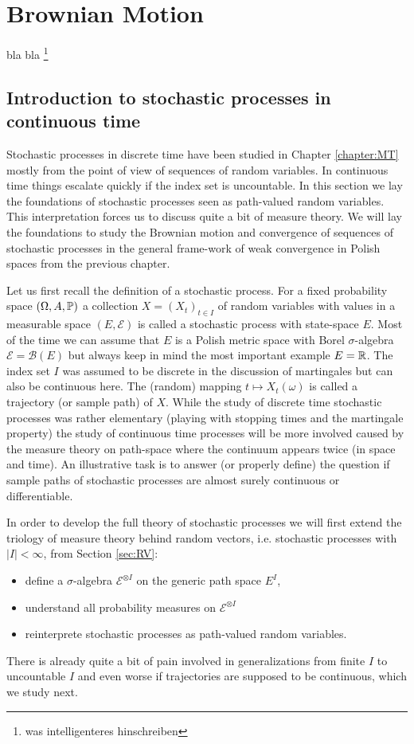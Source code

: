 \chapter{Brownian Motion}\label{sec:BM}
\marginpar{\textcolor{red}{Lecture 19}}

bla bla \footnote{was intelligenteres hinschreiben}
\section[Stochastic processes in continuous time]{Introduction to stochastic processes in continuous time}\label{sec:SP}
	Stochastic processes in discrete time have been studied in Chapter \ref{chapter:MT} mostly from the point of view of sequences of random variables. In continuous time things escalate quickly if the index set is uncountable. In this section we lay the foundations of stochastic processes seen as path-valued random variables. This interpretation forces us to discuss quite a bit of measure theory. We will lay the foundations to study the Brownian motion and convergence of sequences of stochastic processes in the general frame-work of weak convergence in Polish spaces from the previous chapter. \smallskip

	Let us first recall the definition of a stochastic process. For a fixed probability space $(\Omega, A, \P)$ a collection $X=(X_t)_{t\in I}$ of random variables with values in a measurable space $(E,\mathcal E)$ is called a stochastic process with state-space $E$. Most of the time we can assume that $E$ is a Polish metric space with Borel $\sigma$-algebra $\mathcal E=\mathcal B(E)$ but always keep in mind the most important example $E=\R$. The index set $I$ was assumed to be discrete in the discussion of martingales but can also be continuous here. The (random) mapping $t\mapsto X_t(\omega)$ is called a trajectory (or sample path) of $X$. While the study of discrete time stochastic processes was rather elementary (playing with stopping times and the martingale property) the study of continuous time processes will be more involved caused by the measure theory on path-space where the continuum appears twice (in space and time). An illustrative task is to answer (or properly define) the question if sample paths of stochastic processes are almost surely continuous or differentiable.\smallskip
	
In order to develop the full theory of stochastic processes we will first extend the triology of measure theory behind random vectors, i.e. stochastic processes with $|I|<\infty$, from Section \ref{sec:RV}:
\begin{itemize}
	\item define a $\sigma$-algebra $\mathcal E^{\otimes I}$ on the generic path space $E^I$,
	\item understand all probability measures on $\mathcal E^{\otimes I}$
	\item reinterprete stochastic processes as path-valued random variables.
\end{itemize}
There is already quite a bit of pain involved in generalizations from finite $I$ to uncountable $I$ and even worse if trajectories are supposed to be continuous, which we study next.

